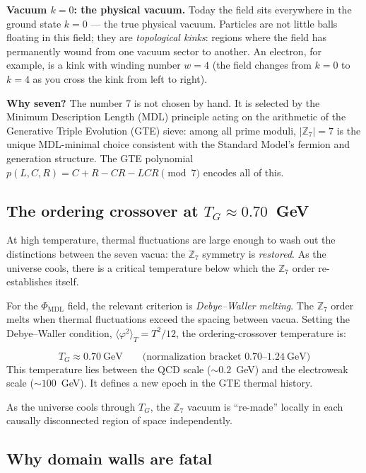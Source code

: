 \documentclass[11pt,a4paper]{article}
\newcommand{\PHIMDL}{\Phi_{\mathrm{MDL}}}
\newcommand{\ZS}{\mathbb{Z}_7}
\begin{document}
\medskip
\noindent
\textbf{Vacuum $k=0$: the physical vacuum.}
Today the field sits everywhere in the ground state $k=0$ --- the
true physical vacuum.
Particles are not little balls floating in this field; they are
\emph{topological kinks}: regions where the field has permanently wound from
one vacuum sector to another.
An electron, for example, is a kink with winding number $w=4$
(the field changes from $k=0$ to $k=4$ as you cross the kink from left to right).

\medskip
\noindent
\textbf{Why seven?}
The number 7 is not chosen by hand.
It is selected by the Minimum Description Length (MDL) principle acting on the
arithmetic of the Generative Triple Evolution (GTE) sieve: among all prime
moduli, $|\ZS| = 7$ is the unique MDL-minimal choice consistent with the
Standard Model's fermion and generation structure.
The GTE polynomial $p(L,C,R) = C + R - CR - LCR \pmod{7}$ encodes all of this.

\subsection{The ordering crossover at \texorpdfstring{$T_G \approx 0.70$~GeV}{TG ≈ 0.70 GeV}}

At high temperature, thermal fluctuations are large enough to wash out the
distinctions between the seven vacua: the $\ZS$ symmetry is \emph{restored}.
As the universe cools, there is a critical temperature below which the
$\ZS$ order re-establishes itself.

For the $\PHIMDL$ field, the relevant criterion is \emph{Debye--Waller melting}.
The $\ZS$ order melts when thermal fluctuations exceed the spacing between vacua.
Setting the Debye--Waller condition, $\langle\varphi^2\rangle_T = T^2/12$,
the ordering-crossover temperature is:

\begin{tcolorbox}[colback=boxgreen,colframe=green!50!black,
  title={The GTE ordering-crossover temperature}]
\[
  T_G \approx 0.70~\text{GeV}
  \qquad
  \text{(normalization bracket } 0.70\text{--}1.24~\text{GeV})
\]
This temperature lies between the QCD scale ($\sim\!0.2$~GeV) and the
electroweak scale ($\sim\!100$~GeV).
It defines a new epoch in the GTE thermal history.
\end{tcolorbox}

\noindent
As the universe cools through $T_G$, the $\ZS$ vacuum is ``re-made'' locally
in each causally disconnected region of space independently.

\subsection{Why domain walls are fatal}
\end{document}
